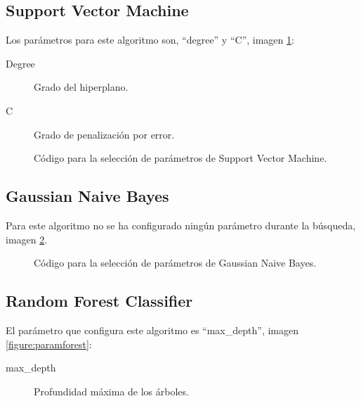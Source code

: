 \subsection{Support Vector Machine}
Los parámetros para este algoritmo son, ``degree'' y ``C'', imagen \ref{figure:paramsvm}:
\begin{description}
    \item [Degree] Grado del hiperplano.
    \item [C] Grado de penalización por error.
\end{description}

\begin{figure}[H]
\centering
{}
\caption{Código para la selección de parámetros de Support Vector Machine.}
\label{figure:paramsvm}
\end{figure}

\subsection{Gaussian Naive Bayes}
Para este algoritmo no se ha configurado ningún parámetro durante la búsqueda, imagen \ref{figure:parambayes}.

\begin{figure}[H]
\centering
{}
\caption{Código para la selección de parámetros de Gaussian Naive Bayes.}
\label{figure:parambayes}
\end{figure}

\subsection{Random Forest Classifier}
El parámetro que configura este algoritmo es ``max\_depth'', imagen \ref{figure:paramforest}:
\begin{description}
    \item [max\_depth] Profundidad máxima de los árboles.
\end{description}

